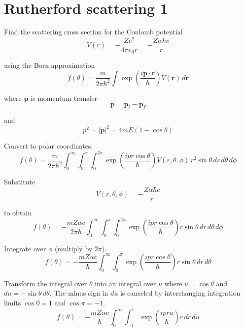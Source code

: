 


\section*{Rutherford scattering 1}

Find the scattering cross section for the Coulomb potential
\begin{equation*}
V(r)=-\frac{Ze^2}{4\pi\varepsilon_0r}
=-\frac{Z\alpha\hbar c}{r}
\end{equation*}

using the Born approximation
\begin{equation*}
f(\theta)=\frac{m}{2\pi\hbar^2}
\int\exp\left(\frac{i\mathbf p\cdot\mathbf r}{\hbar}\right)V(\mathbf r)\,d\mathbf r
\end{equation*}

where $\mathbf p$ is momentum transfer
\begin{equation*}
\mathbf p=\mathbf p_i-\mathbf p_f
\end{equation*}

and
\begin{equation*}
p^2=|\mathbf p|^2=4mE(1-\cos\theta)
\end{equation*}

Convert to polar coordinates.
\begin{equation*}
f(\theta)
=\frac{m}{2\pi\hbar^2}
\int_0^\infty
\int_0^\pi
\int_0^{2\pi}
\exp\left(\frac{ipr\cos\theta}{\hbar}\right)V(r,\theta,\phi)
\,r^2\sin\theta\,dr\,d\theta\,d\phi
\end{equation*}

Substitute
\begin{equation*}
V(r,\theta,\phi)=-\frac{Z\alpha\hbar c}{r}
\end{equation*}

to obtain
\begin{equation*}
f(\theta)
=-\frac{mZ\alpha c}{2\pi\hbar}
\int_0^\infty
\int_0^\pi
\int_0^{2\pi}
\exp\left(\frac{ipr\cos\theta}{\hbar}\right)
r\sin\theta\,dr\,d\theta\,d\phi
\end{equation*}

Integrate over $\phi$ (multiply by $2\pi$).
\begin{equation*}
f(\theta)
=-\frac{mZ\alpha c}{\hbar}
\int_0^\infty
\int_0^\pi
\exp\left(\frac{ipr\cos\theta}{\hbar}\right)
r\sin\theta\,dr\,d\theta
\end{equation*}

Transform the integral over $\theta$ into an integral over $u$
where $u=\cos\theta$ and $du=-\sin\theta\,d\theta$.
The minus sign in $du$ is canceled by interchanging integration limits
$\cos0=1$ and $\cos\pi=-1$.
\begin{equation*}
f(\theta)
=-\frac{mZ\alpha c}{\hbar}
\int_0^\infty
\int_{-1}^1
\exp\left(\frac{ipru}{\hbar}\right)
r\,dr\,du
\end{equation*}

